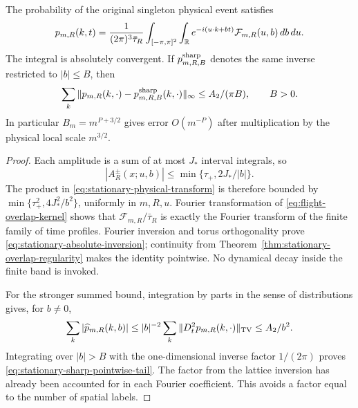\begin{theorem}
\label{thm:stationary-polynomial-band}
The probability of the original singleton physical event satisfies
\begin{equation}\label{eq:stationary-absolute-inversion}
 p_{m,R}(k,t)=\frac1{(2\pi)^3\bar\tau_R}
 \int_{[-\pi,\pi]^2}\int_\R
 e^{-i(u\cdot k+bt)}\mathcal F_{m,R}(u,b)\,db\,du.
\end{equation}
The integral is absolutely convergent. If $p^{\rm sharp}_{m,R,B}$
denotes the same inverse restricted to $|b|\le B$, then
\begin{equation}\label{eq:stationary-sharp-pointwise-tail}
 \sum_k\|p_{m,R}(k,\cdot)-p^{\rm sharp}_{m,R,B}(k,\cdot)\|_\infty
                          \le A_2/(\pi B),\qquad B>0.
\end{equation}
In particular $B_m=m^{P+3/2}$ gives error $O(m^{-P})$ after
multiplication by the physical local scale $m^{3/2}$.
\end{theorem}
\begin{proof}
Each amplitude is a sum of at most $J_*$ interval integrals, so
\begin{equation}\label{eq:flight-amplitude-decay}
 |A_R^\pm(x;u,b)|\le\min\{\tau_+,2J_*/|b|\}.
\end{equation}
The product in \eqref{eq:stationary-physical-transform} is therefore
bounded by $\min\{\tau_+^2,4J_*^2/b^2\}$, uniformly in $m,R,u$.
Fourier transformation of \eqref{eq:flight-overlap-kernel} shows that
$\mathcal F_{m,R}/\bar\tau_R$ is exactly the Fourier transform of the
finite family of time profiles. Fourier inversion and torus
orthogonality prove \eqref{eq:stationary-absolute-inversion}; continuity
from Theorem~\ref{thm:stationary-overlap-regularity} makes the identity
pointwise. No dynamical decay inside the finite band is invoked.

For the stronger summed bound, integration by parts in the sense of
distributions gives, for $b\ne0$,
\[
 \sum_k|\widehat p_{m,R}(k,b)|
 \le |b|^{-2}\sum_k\|D_t^2p_{m,R}(k,\cdot)\|_{\operatorname{TV}}
 \le A_2/b^2.
\]
Integrating over $|b|>B$ with the one-dimensional inverse factor
$1/(2\pi)$ proves \eqref{eq:stationary-sharp-pointwise-tail}.
The factor from the lattice inversion has already been accounted for
in each Fourier coefficient. This avoids a factor equal to the number
of spatial labels.
\end{proof}

